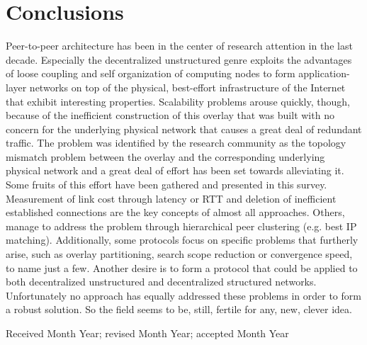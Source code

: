 \documentclass[acmcsur,acmnow]{acmtrans2m}
\begin{document}
\section{Conclusions}
Peer-to-peer architecture has been in the center of research attention in the
last decade. Especially the decentralized unstructured genre exploits the
advantages of loose coupling and self organization of computing nodes to form
application-layer networks on top of the physical, best-effort infrastructure of
the Internet that exhibit interesting properties. Scalability problems arouse
quickly, though, because of the inefficient construction of this overlay that
was built with no concern for the underlying physical network that causes a
great deal of redundant traffic. The problem was identified by the research
community as the topology mismatch problem between the overlay and the
corresponding underlying physical network and a great deal of effort has been
set towards alleviating it. Some fruits of this effort have been gathered and
presented in this survey. Measurement of link cost through latency or RTT and
deletion of inefficient established connections are the key concepts of almost
all approaches. Others, manage to address the problem through hierarchical peer
clustering (e.g. best IP matching). Additionally, some protocols focus on
specific problems that furtherly arise, such as overlay partitioning, search
scope reduction or convergence speed, to name just a few. Another desire is to
form a protocol that could be applied to both decentralized unstructured and
decentralized structured networks. Unfortunately no approach has equally
addressed these problems in order to form a robust solution. So the field seems
to be, still, fertile for any, new, clever idea.





%

\begin{received}
Received Month Year;
revised Month Year; accepted Month Year
\end{received}
\end{document}
